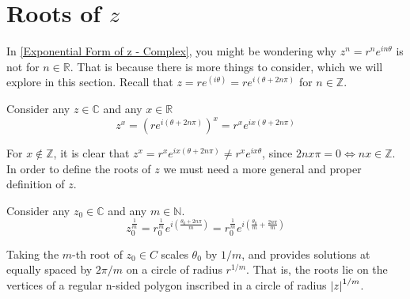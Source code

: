 \documentclass[12pt, english]{book}
\begin{document}
	\section{Roots of \texorpdfstring{\(z\)}{TEXT}} \label{Roots of z Sections - Complex}
	In \cref{Exponential Form of z - Complex}, you might be wondering why $z^n = r^n e^{i n \theta}$ is not for $n \in \mathbb{R}$. That is because there is more things to consider, which we will explore in this section. Recall that $z = re^(i \theta) = re^{i (\theta + 2n \pi)}$ for $n \in \mathbb{Z}$. 
	
	\begin{definition}
		Consider any $z \in \mathbb{C}$ and any $x \in \mathbb{R}$
		$$z^x = \left(r e^{i(\theta + 2 n \pi)} \right)^x = r^x e^{i x(\theta + 2n \pi)}$$
		\label{Exponential of z Definiion - Complex}
	\end{definition}

	For $x \nin \mathbb{Z}$, it is clear that $z^x =  r^x e^{ix(\theta + 2 n \pi)} \neq r^x e^{ix\theta}$, since $2nx\pi = 0 \iff nx \in \mathbb{Z}$. In order to define the roots of $z$ we must need a more general and proper definition of $z$.
	
	\begin{definition}
		\label{Roots of z Definition - Complex}
		Consider any $z_0 \in \mathbb{C}$ and any $m \in \mathbb{N}$.
		$$z_0^{\frac{1}{m}} = r_0^\frac{1}{m} e^{i\left(\frac{\theta_0 + 2n \pi}{m}\right)} = r_0^\frac{1}{m} e^{i \left(\frac{\theta_0}{m} + \frac{2n \pi}{m}\right)}$$
	\end{definition}  
	
	Taking the $m$-th root of $z_0 \in C$ scales $\theta_0$ by $1/m$, and provides solutions at equally spaced by $2\pi / m$ on a circle of radius $r^{1/m}$. That is, the roots lie on the vertices of a regular n-sided polygon inscribed in a circle of radius $\abs{z}^{1/m}$. 
	
\end{document}
